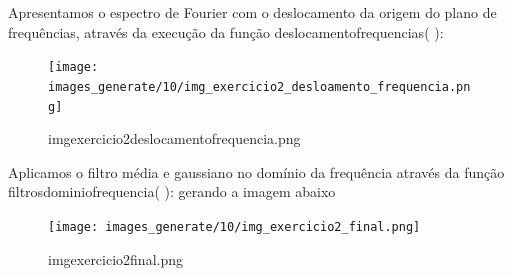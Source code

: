 \documentclass[10pt,a4paper]{article}
\begin{document}
Apresentamos o espectro de Fourier com o deslocamento da origem do plano de frequências, através da execução da função {\ttfamily deslocamento\textunderscore frequencias( ):}

\begin{figure}[H]
    \centering
    \texttt{[image: images\_generate/10/img\_exercicio2\_desloamento\_frequencia.png]}
    \caption{img\textunderscore exercicio2\textunderscore deslocamento\textunderscore frequencia.png}
\end{figure}

Aplicamos o filtro média e gaussiano no domínio da frequência através da função {\ttfamily filtros\textunderscore dominio\textunderscore frequencia( ):} gerando a imagem abaixo

\begin{figure}[H]
    \centering
    \texttt{[image: images\_generate/10/img\_exercicio2\_final.png]}
    \caption{img\textunderscore exercicio2\textunderscore final.png}
\end{figure}
\end{document}
